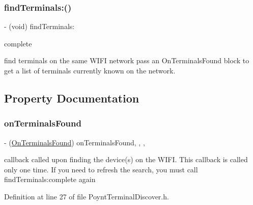 \subsubsection{\texorpdfstring{find\+Terminals\+:()}{findTerminals:()}}
{\footnotesize\ttfamily -\/ (void) find\+Terminals\+: \begin{DoxyParamCaption}\item[{(\hyperlink{_poynt_terminal_discover_8h_a45c48a836064cd340f281fa5ef2edef5}{On\+Terminals\+Found})}]{complete }\end{DoxyParamCaption}}



find terminals on the same W\+I\+FI network  pass an On\+Terminals\+Found block to get a list of terminals currently known on the network. 



\subsection{Property Documentation}
\hypertarget{interface_poynt_terminal_discover_a2108a121006de9953dbf24fa265db472}{}\label{interface_poynt_terminal_discover_a2108a121006de9953dbf24fa265db472} 
\subsubsection{\texorpdfstring{on\+Terminals\+Found}{onTerminalsFound}}
{\footnotesize\ttfamily -\/ (\hyperlink{_poynt_terminal_discover_8h_a45c48a836064cd340f281fa5ef2edef5}{On\+Terminals\+Found}) on\+Terminals\+Found\hspace{0.3cm}{\ttfamily [read]}, {\ttfamily [write]}, {\ttfamily [nonatomic]}, {\ttfamily [copy]}}



callback called upon finding the device(s) on the W\+I\+FI.  This callback is called only one time. If you need to refresh the search, you must call find\+Terminals\+:complete again 



Definition at line 27 of file Poynt\+Terminal\+Discover.\+h.

\hypertarget{interface_poynt_terminal_discover_a3ec4dc196847dee68ad6c99d08bfef95}{}\label{interface_poynt_terminal_discover_a3ec4dc196847dee68ad6c99d08bfef95} 
